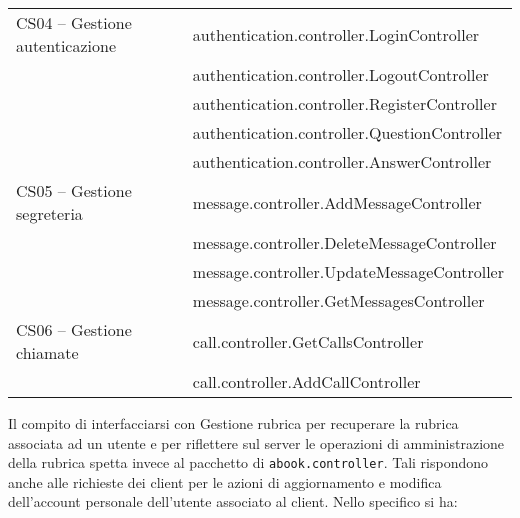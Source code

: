 \begin{description}
\begin{center}
\begin{tabular}{>{\sffamily}l>{\ttfamily}p{}}
CS04 -- Gestione autenticazione 


& authentication.controller.LoginController\\
& authentication.controller.LogoutController\\
& authentication.controller.RegisterController\\
& authentication.controller.QuestionController\\
& authentication.controller.AnswerController\\



CS05 -- Gestione segreteria 

& message.controller.AddMessageController\\
& message.controller.DeleteMessageController\\
& message.controller.UpdateMessageController\\
& message.controller.GetMessagesController\\



CS06 -- Gestione chiamate 

& call.controller.GetCallsController\\
& call.controller.AddCallController\\

\bottomrule
\end{tabular}
\end{center}

Il compito di interfacciarsi con \textsf{Gestione rubrica} per recuperare la rubrica associata ad un utente e per riflettere sul server le operazioni di amministrazione della rubrica spetta invece al pacchetto di  \texttt{abook.controller}. Tali  rispondono anche alle richieste dei client per le azioni di aggiornamento e modifica dell'account personale dell'utente associato al client. Nello specifico si ha:


\end{description}
